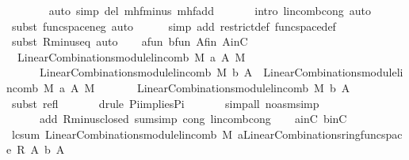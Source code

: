 \begin{isabellebody}
\ \ \ \ \ \ \isamarkupfalse%
\ {\isacharparenleft}auto\ simp\ del{\isacharcolon}\ mh{\isachardot}f{\isacharunderscore}minus\ mh{\isachardot}f{\isacharunderscore}add\ {\isacharparenright}\isanewline
\ \ \ \ \isamarkupfalse%
\ {\isacharparenleft}intro\ lincomb{\isacharunderscore}cong{\isacharcomma}\ auto{\isacharparenright}\isanewline
\ \ \ \ \isamarkupfalse%
\ {\isacharparenleft}subst\ func{\isacharunderscore}space{\isacharunderscore}neg{\isacharcomma}\ auto{\isacharparenright}\isanewline
\ \ \ \ \isamarkupfalse%
\ {\isacharparenleft}simp\ add{\isacharcolon}\ restrict{\isacharunderscore}def\ func{\isacharunderscore}space{\isacharunderscore}def{\isacharparenright}\isanewline
\ \ \ \ \isamarkupfalse%
\ {\isacharparenleft}subst\ R{\isachardot}minus{\isacharunderscore}eq{\isacharcomma}\ auto{\isacharparenright}\isanewline
\ \ \isamarkupfalse%
\ a{\isacharunderscore}fun\ b{\isacharunderscore}fun\ A{\isacharunderscore}fin\ AinC\isanewline
\ \ \isamarkupfalse%
\ {}{\isacharcolon}\ {\isachardoublequoteopen}LinearCombinations{\isachardot}module{\isachardot}lincomb\ M\ {\isacharquery}a\ A\ {\isasymominus}\isactrlbsub M\isactrlesub \ \isanewline
\ \ \ \ \ \ LinearCombinations{\isachardot}module{\isachardot}lincomb\ M\ {\isacharquery}b\ A\ {\isacharequal}\ LinearCombinations{\isachardot}module{\isachardot}lincomb\ M\ a\ A\ {\isasymominus}\isactrlbsub M\isactrlesub \ \isanewline
\ \ \ \ \ \ LinearCombinations{\isachardot}module{\isachardot}lincomb\ M\ b\ A{\isachardoublequoteclose}\isanewline
\ \ \ \ \isamarkupfalse%
\ {\isacharparenleft}subst\ refl{\isacharparenright}\ \isanewline
\ \ \ \ \isamarkupfalse%
\ {\isacharparenleft}drule\ Pi{\isacharunderscore}implies{\isacharunderscore}Pi{}{\isacharparenright}{\isacharplus}\ \isanewline
\ \ \ \ \isamarkupfalse%
\ {\isacharparenleft}simp{\isacharunderscore}all\ {\isacharparenleft}no{\isacharunderscore}asm{\isacharunderscore}simp{\isacharparenright}\ \isanewline
\ \ \ \ \ \ add{\isacharcolon}\ R{\isachardot}minus{\isacharunderscore}closed\ sum{\isacharunderscore}simp\ cong{\isacharcolon}\ lincomb{\isacharunderscore}cong{\isacharparenright}\isanewline
\ \ \isamarkupfalse%
\ ainC\ binC\ \isamarkupfalse%
\ lc{\isacharunderscore}sum{\isacharcolon}\ {\isachardoublequoteopen}LinearCombinations{\isachardot}module{\isachardot}lincomb\ M\ {\isacharparenleft}{\isacharquery}a{\isasymominus}\isactrlbsub {\isacharparenleft}LinearCombinations{\isachardot}ring{\isachardot}func{\isacharunderscore}space\ R\ A{\isacharparenright}\isactrlesub \ {\isacharquery}b{\isacharparenright}\ A\isanewline

\end{isabellebody}
